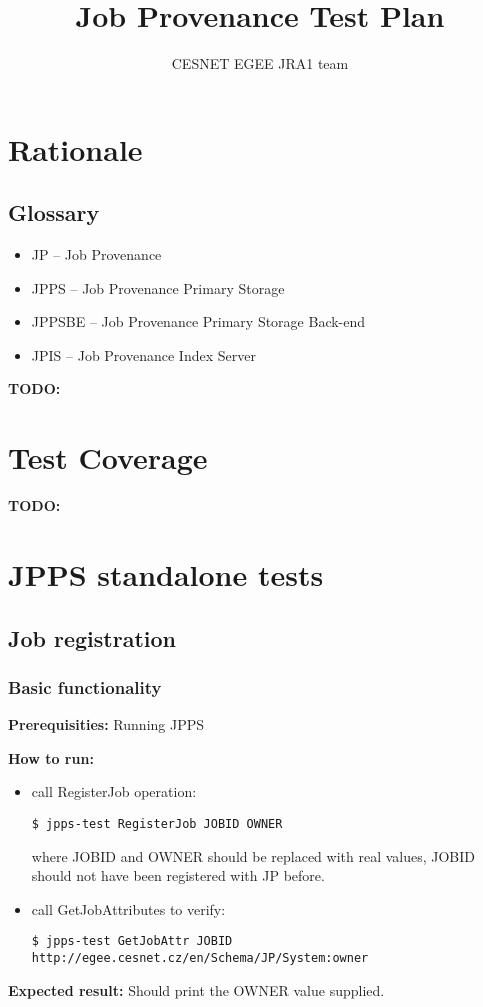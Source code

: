 \documentclass{egee}
\title{Job Provenance Test Plan}
\author{CESNET EGEE JRA1 team}
\def\req{\noindent\textbf{Prerequisities: }}
\def\how{\noindent\textbf{How to run: }}
\def\result{\noindent\textbf{Expected result: }}
\def\todo#1{\textbf{TODO:} #1}
\begin{document}

\newpage
\tableofcontents
\newpage

\section{Rationale}
\subsection{Glossary}
\begin{itemize}
\item JP -- Job Provenance
\item JPPS -- Job Provenance Primary Storage
\item JPPSBE -- Job Provenance Primary Storage Back-end
\item JPIS -- Job Provenance Index Server
\end{itemize}

\todo{}

\section{Test Coverage}
\todo{}


\section{JPPS standalone tests}

\subsection{Job registration}

\subsubsection{Basic functionality}
\label{regjob}
\req Running JPPS

\how
\begin{itemize}
\item call RegisterJob operation:
\begin{verbatim}
$ jpps-test RegisterJob JOBID OWNER
\end{verbatim}
where JOBID and OWNER should be replaced with real values, JOBID should not have
been registered with JP before.

\item  call GetJobAttributes to verify:
\begin{verbatim}
$ jpps-test GetJobAttr JOBID http://egee.cesnet.cz/en/Schema/JP/System:owner
\end{verbatim}
\end{itemize}
\result Should print the OWNER value supplied.
\end{document}
